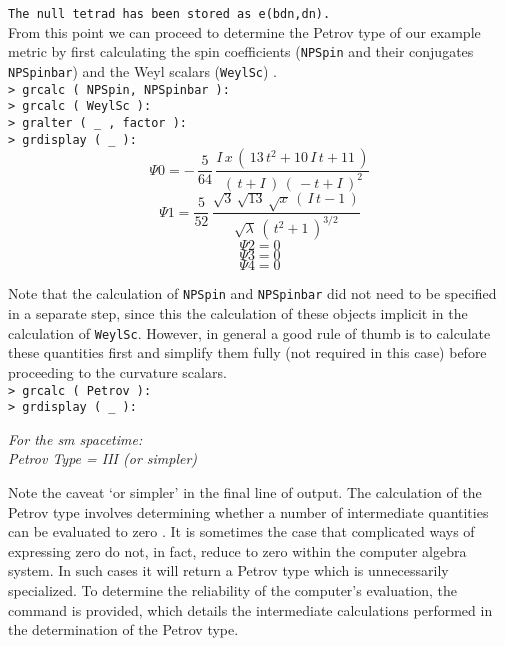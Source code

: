 \documentclass{article}
\begin{document}
{\indent\texttt{The null tetrad has been stored as e(bdn,dn).}\\

\noindent From this point we can proceed to determine the Petrov
type of our example metric by first calculating the spin coefficients
(\texttt{NPSpin} and their conjugates \texttt{NPSpinbar}) and the Weyl
scalars (\texttt{WeylSc}) \cite{newman/penrose:1962}.\\

\noindent\texttt{> grcalc ( NPSpin, NPSpinbar ):\\
> grcalc ( WeylSc ):\\
> gralter ( \_ , factor ):\\
> grdisplay ( \_ ):}
  \[ { \Psi 0}= - \,{\displaystyle \frac {5}{64}}\,{\displaystyle 
    \frac {{I}\,{x}\,(\,13\,{t}^{2} + 10\,{I}\,{t} + 11\,)}{(\,{t} + 
    {I}\,)\,(\, - {t} + {I}\,)^{2}}} \]
  \[ { \Psi 1}={\displaystyle \frac {5}{52}}\,{\displaystyle \frac {
    \sqrt {3}\,\sqrt {13}\,\sqrt {{x}}\,(\,{I}\,{t} - 1\,)}{\sqrt {{ 
    \lambda}}\,(\,{t}^{2} + 1\,)^{3/2}}} \]
  \[ { \Psi 2}=0 \]
  \[ { \Psi 3}=0 \]
  \[ { \Psi 4}=0 \]

\noindent Note that the calculation of \texttt{NPSpin} and \texttt{NPSpinbar}
did not need to be specified in a separate step, since this
the calculation of these objects implicit in the calculation of
\texttt{WeylSc}. However, in general a good rule of thumb is to calculate
these quantities first and simplify them fully (not required in this
case) before proceeding to the curvature scalars.\\

\noindent\texttt{> grcalc ( Petrov ):\\
> grdisplay ( \_ ):}
\begin{center}\textit{For the sm spacetime:\\
  Petrov Type = III (or simpler)}
\end{center}
\noindent Note the caveat `or simpler' in the final line of output. The
calculation of the Petrov type involves determining whether a number of
intermediate quantities can be evaluated to zero
\cite{letniowski/mclenaghan:1988}.
It is sometimes the case that complicated ways of expressing zero do not, in
fact, reduce to zero within the computer algebra system. In such cases it will 
return a Petrov type which is unnecessarily specialized. To determine the
reliability of the computer's evaluation, the  command
is provided, which details the intermediate calculations performed in
the determination of the Petrov type.\\

}
\end{document}
